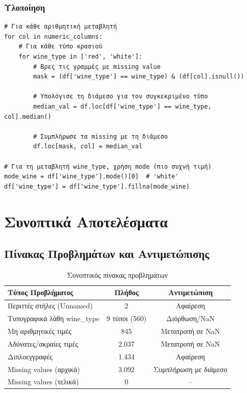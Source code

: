 \documentclass[12pt,a4paper]{article}
\begin{document}
\subsubsection{Υλοποίηση}

\begin{lstlisting}[caption={Συμπλήρωση missing values με διάμεσο}]
# Για κάθε αριθμητική μεταβλητή
for col in numeric_columns:
    # Για κάθε τύπο κρασιού
    for wine_type in ['red', 'white']:
        # Βρες τις γραμμές με missing value
        mask = (df['wine_type'] == wine_type) & (df[col].isnull())
        
        # Υπολόγισε τη διάμεσο για τον συγκεκριμένο τύπο
        median_val = df.loc[df['wine_type'] == wine_type, col].median()
        
        # Συμπλήρωσε τα missing με τη διάμεσο
        df.loc[mask, col] = median_val

# Για τη μεταβλητή wine_type, χρήση mode (πιο συχνή τιμή)
mode_wine = df['wine_type'].mode()[0]  # 'white'
df['wine_type'] = df['wine_type'].fillna(mode_wine)
\end{lstlisting}

\section{Συνοπτικά Αποτελέσματα}

\subsection{Πίνακας Προβλημάτων και Αντιμετώπισης}

\begin{table}[H]
\centering
\caption{Συνοπτικός πίνακας προβλημάτων}
\label{tab:summary}
\begin{tabular}{@{}lcc@{}}
\toprule
\textbf{Τύπος Προβλήματος} & \textbf{Πλήθος} & \textbf{Αντιμετώπιση} \\
\midrule
Περιττές στήλες (Unnamed) & 2 & Αφαίρεση \\
Τυπογραφικά λάθη wine\_type & 9 τύποι (560) & Διόρθωση/NaN \\
Μη αριθμητικές τιμές & 845 & Μετατροπή σε NaN \\
Αδύνατες/ακραίες τιμές & 2.037 & Μετατροπή σε NaN \\
Διπλοεγγραφές & 1.434 & Αφαίρεση \\
Missing values (αρχικά) & 3.092 & Συμπλήρωση με διάμεσο \\
Missing values (τελικά) & 0 & -- \\
\bottomrule
\end{tabular}
\end{table}
\end{document}

